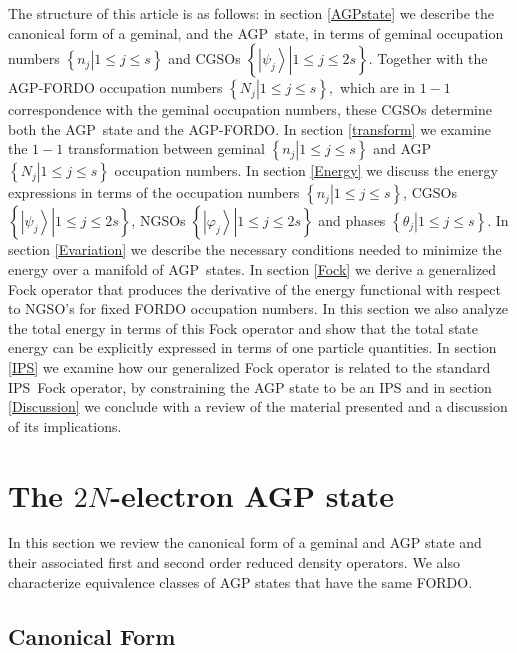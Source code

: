 \documentclass[titlepage]{article}%
\begin{document}
The structure of this article is as follows: in section \ref{AGPstate} we
describe the canonical form of a geminal, and the AGP\ state, in terms of
geminal occupation numbers $\left\{  \left.  n_{j}\right\vert 1\leq j\leq
s\right\}  $ and CGSOs $\left\{  \left.  \left\vert \psi_{j}\right\rangle
\right\vert 1\leq j\leq2s\right\}  .$ Together with the AGP-FORDO occupation
numbers $\left\{  \left.  N_{j}\right\vert 1\leq j\leq s\right\}  ,$ which are
in $1-1$ correspondence with the geminal occupation numbers, these CGSOs
determine both the AGP\ state and the AGP-FORDO. In section \ref{transform} we
examine the $1-1$ transformation between geminal $\left\{  \left.
n_{j}\right\vert 1\leq j\leq s\right\}  $ and AGP $\left\{  \left.
N_{j}\right\vert 1\leq j\leq s\right\}  $ occupation numbers. In section
\ref{Energy} we discuss the energy expressions in terms of the occupation
numbers $\left\{  \left.  n_{j}\right\vert 1\leq j\leq s\right\}  $, CGSOs
$\left\{  \left.  \left\vert \psi_{j}\right\rangle \right\vert 1\leq
j\leq2s\right\}  $, NGSOs $\left\{  \left.  \left\vert \varphi_{j}%
\right\rangle \right\vert 1\leq j\leq2s\right\}  $ and phases $\left\{
\left.  \theta_{j}\right\vert 1\leq j\leq s\right\}  .$ In section
\ref{Evariation} we describe the necessary conditions needed to minimize the
energy over a manifold of AGP\ states. In section \ref{Fock} we derive a
generalized Fock operator that produces the derivative of the energy
functional with respect to NGSO's for fixed FORDO occupation numbers. In this
section we also analyze the total energy in terms of this Fock operator and
show that the total state energy can be explicitly expressed in terms of one
particle quantities. In section \ref{IPS} we examine how our generalized Fock
operator is related to the standard IPS\ Fock operator, by constraining the
AGP state to be an IPS and in section \ref{Discussion} we conclude with a
review of the material presented and a discussion of its implications.

\section{The $2N$-electron AGP state\label{AGPstate}}

In this section we review the canonical form of a geminal and AGP state and
their associated first and second order reduced density operators. We also
characterize equivalence classes of AGP states that have the same FORDO.

\subsection{Canonical Form}
\end{document}
